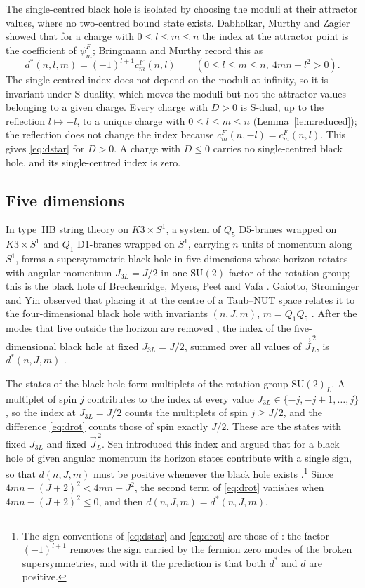 \documentclass[11pt]{amsart}
\theoremstyle{definition}
\newcommand{\cF}{c^{F}}
\newcommand{\dstar}{d^{*}}
\begin{document}
The single-centred black hole is isolated by choosing the moduli at their attractor values, where no two-centred bound state exists. Dabholkar, Murthy and Zagier showed that for a charge with $0\le l\le m\le n$ the index at the attractor point is the coefficient of $\psi^F_m$; Bringmann and Murthy record this as \cite[\S3.1]{BM13}
\[
\dstar(n,l,m)=(-1)^{l+1}\cF_m(n,l)\qquad(0\le l\le m\le n,\ 4mn-l^2>0).
\]
The single-centred index does not depend on the moduli at infinity, so it is invariant under S-duality, which moves the moduli but not the attractor values belonging to a given charge. Every charge with $D>0$ is S-dual, up to the reflection $l\mapsto-l$, to a unique charge with $0\le l\le m\le n$ (Lemma~\ref{lem:reduced}); the reflection does not change the index because $\cF_m(n,-l)=\cF_m(n,l)$. This gives \eqref{eq:dstar} for $D>0$. A charge with $D\le0$ carries no single-centred black hole, and its single-centred index is zero.

\subsection{Five dimensions}\label{ssec:5d}
In type~IIB string theory on $K3\times S^1$, a system of $Q_5$ D5-branes wrapped on $K3\times S^1$ and $Q_1$ D1-branes wrapped on $S^1$, carrying $n$ units of momentum along $S^1$, forms a supersymmetric black hole in five dimensions whose horizon rotates with angular momentum $J_{3L}=J/2$ in one $\mathrm{SU}(2)$ factor of the rotation group; this is the black hole of Breckenridge, Myers, Peet and Vafa \cite{BMPV97}. Gaiotto, Strominger and Yin observed that placing it at the centre of a Taub--NUT space relates it to the four-dimensional black hole with invariants $(n,J,m)$, $m=Q_1Q_5$ \cite{GSY06}. After the modes that live outside the horizon are removed \cite{BMS09,CM09}, the index of the five-dimensional black hole at fixed $J_{3L}=J/2$, summed over all values of $\vec J_L^{\,2}$, is $\dstar(n,J,m)$ \cite[\S2.3, \S3.1]{BM13}.

The states of the black hole form multiplets of the rotation group $\mathrm{SU}(2)_L$. A multiplet of spin $j$ contributes to the index at every value $J_{3L}\in\{-j,-j+1,\dots,j\}$, so the index at $J_{3L}=J/2$ counts the multiplets of spin $j\ge J/2$, and the difference \eqref{eq:drot} counts those of spin exactly $J/2$. These are the states with fixed $J_{3L}$ and fixed $\vec J_L^{\,2}$. Sen introduced this index and argued that for a black hole of given angular momentum its horizon states contribute with a single sign, so that $d(n,J,m)$ must be positive whenever the black hole exists \cite{Sen12}.\footnote{The sign conventions of \eqref{eq:dstar} and \eqref{eq:drot} are those of \cite{BM13}: the factor $(-1)^{l+1}$ removes the sign carried by the fermion zero modes of the broken supersymmetries, and with it the prediction is that both $\dstar$ and $d$ are positive.} Since $4mn-(J+2)^2<4mn-J^2$, the second term of \eqref{eq:drot} vanishes when $4mn-(J+2)^2\le0$, and then $d(n,J,m)=\dstar(n,J,m)$.
\end{document}
